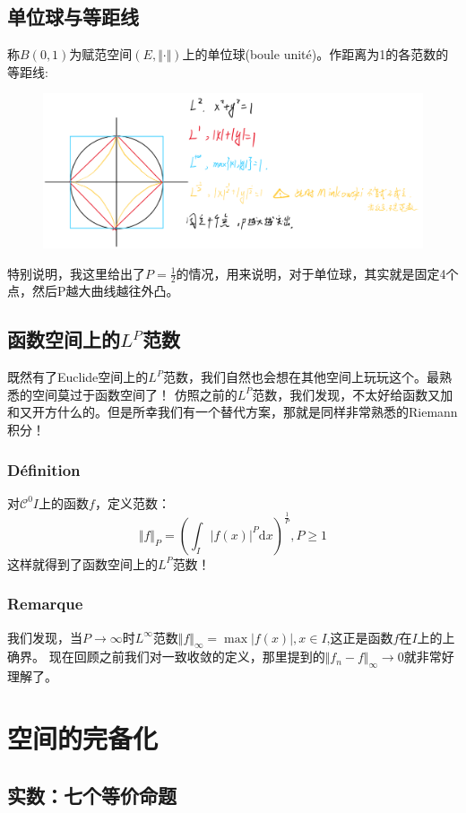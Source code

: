 \documentclass[12pt, a4paper, oneside]{ctexbook}
\begin{document}
  \subsection{单位球与等距线}
  称$B(0,1)$为赋范空间$(E,\Vert \cdot \Vert)$上的单位球(boule unité)。作距离为1的各范数的等距线:
  \begin{figure}[H]%
    \centering
    \includegraphics[scale=0.6]{danweiqiu.png}
    \label{fig:1}
  \end{figure}
  特别说明，我这里给出了$P=\frac{1}{2}$的情况，用来说明，对于单位球，其实就是固定4个点，然后P越大曲线越往外凸。
  \subsection{函数空间上的$L^P$范数}
  既然有了Euclide空间上的$L^P$范数，我们自然也会想在其他空间上玩玩这个。最熟悉的空间莫过于函数空间了！
  仿照之前的$L^P$范数，我们发现，不太好给函数又加和又开方什么的。但是所幸我们有一个替代方案，那就是同样非常熟悉的Riemann积分！
  \subsubsection{Définition}
  对$\mathcal{C} ^0I$上的函数$f$，定义范数：
  $$
  \Vert f \Vert_P=(\int_{I}|f(x)|^P \mathrm{d} x)^{\frac{1}{P}},P\ge1
  $$
  这样就得到了函数空间上的$L^P$范数！
  \subsubsection{Remarque}
  我们发现，当$P\rightarrow \infty$时$L^\infty$范数$\Vert f \Vert_\infty=\max|f(x)|,x\in I$,这正是函数$f$在$I$上的上确界。
  现在回顾之前我们对一致收敛的定义，那里提到的$\Vert f_n-f \Vert_\infty\rightarrow 0$就非常好理解了。
\section{空间的完备化}
  \subsection{实数：七个等价命题}
\end{document}

